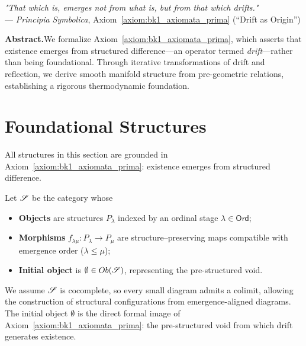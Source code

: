 {}
\begin{center}
\textit{"That which is, emerges not from what is, but from that which drifts."} \\
— \textit{Principia Symbolica}, Axiom~\ref{axiom:bk1_axiomata_prima} (“Drift as Origin”)
\end{center}
\noindent\textbf{Abstract.}\hspace*{1em}We formalize
Axiom~\ref{axiom:bk1_axiomata_prima}, which asserts that existence emerges from
structured difference—an operator termed \textit{drift}—rather than being
foundational. Through iterative transformations of drift and reflection, we
derive smooth manifold structure from pre-geometric relations, establishing a
rigorous thermodynamic foundation.
\section{Foundational Structures}
\label{sec:bk1_foundational_structures}
All structures in this section are grounded in Axiom~\ref{axiom:bk1_axiomata_prima}: existence emerges from structured difference.
\begin{definition}
\label{definition:bk1_let_cats_be_the_category}
Let \(\mathscr{S}\) be the category whose
\begin{itemize}
  \item \textbf{Objects} are structures \(P_\lambda\) indexed by an ordinal stage \(\lambda \in \mathsf{Ord}\);
  \item \textbf{Morphisms} \(f_{\lambda\mu}\colon P_\lambda \to P_\mu\) are structure–preserving maps compatible with emergence order (\(\lambda \le \mu\));
  \item \textbf{Initial object} is \(\emptyset \in Ob(\mathscr{S})\), representing the pre-structured void.
\end{itemize}
We assume \(\mathscr{S}\) is cocomplete, so every small diagram admits a colimit, allowing the construction of structural configurations from emergence-aligned diagrams. The initial object $\emptyset$ is the direct formal image of Axiom~\ref{axiom:bk1_axiomata_prima}: the pre-structured void from which drift generates existence. \qedhere
\end{definition}
\vspace{1.2em}
